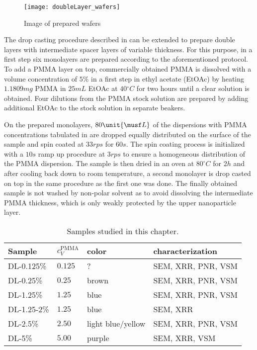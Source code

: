 \documentclass[\main/dresen_thesis.tex]{subfiles}
\begin{document}
  \begin{figure}[tb]
    \centering
    \texttt{[image: doubleLayer\_wafers]}
    \caption{\label{fig:doubleLayers:preparation:waferImage}Image of prepared wafers}
  \end{figure}

  The drop casting procedure described in  can be extended to prepare double layers with intermediate spacer layers of variable thickness.
  For this purpose, in a first step six monolayers are prepared according to the aforementioned protocol.
  To add a PMMA layer on top, commercially obtained PMMA is dissolved with a volume concentration of $5 \%$ in a first step in ethyl acetate (EtOAc) by heating $1.1809 \unit{mg}$ PMMA in $25 \unit{mL}$ EtOAc at $40 \unit{^\circ C}$ for two hours until a clear solution is obtained.
  Four dilutions from the PMMA stock solution are prepared by adding additional EtOAc to the stock solution in separate beakers.

  On the prepared monolayers, $80 \unit{\musf L}$ of the dispersions with PMMA concentrations tabulated in  are dropped equally distributed on the surface of the sample and spin coated at $33 \unit{rps}$ for $60 \unit{s}$.
  The spin coating process is initialized with a $10 \unit{s}$ ramp up procedure at $3 \unit{rps}$ to ensure a homogeneous distribution of the PMMA dispersion.
  The sample is then dried in an oven at $80 ^\circ C$ for $2 \unit{h}$ and after cooling back down to room temperature, a second monolayer is drop casted on top in the same procedure as the first one was done.
  The finally obtained sample is not washed by non-polar solvent as to avoid dissolving the intermediate PMMA thickness, which is only weakly protected by the upper nanoparticle layer.

  \begin{table}[!htbp]
    \centering
    \caption{\label{tab:doubleLayers:preparation:samples}Samples studied in this chapter.}
    \begin{tabular}{ l | l | l | l}
      \textbf{Sample}  & $c_V^\mathrm{PMMA}$ & color & characterization\\
      \hline
      DL-0.125\%    & $0.125$ & ?               & SEM, XRR, PNR, VSM\\
      DL-0.25\%     & $0.25$ & brown            & SEM, XRR, PNR, VSM\\
      DL-1.25\%     & $1.25$ & blue             & SEM, XRR, PNR, VSM\\
      DL-1.25-2\%   & $1.25$ & blue             & SEM, XRR\\
      DL-2.5\%      & $2.50$ & light blue/yellow& SEM, XRR, PNR, VSM\\
      DL-5\%        & $5.00$ & purple           & SEM, XRR, VSM\\
      \hline
    \end{tabular}
  \end{table}

\end{document}
